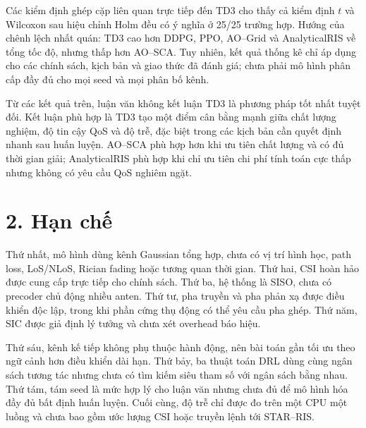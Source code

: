Các kiểm định ghép cặp liên quan trực tiếp đến TD3 cho thấy cả kiểm định $t$ và Wilcoxon sau hiệu chỉnh Holm đều có ý nghĩa ở 25/25 trường hợp. Hướng của chênh lệch nhất quán: TD3 cao hơn DDPG, PPO, AO--Grid và AnalyticalRIS về tổng tốc độ, nhưng thấp hơn AO--SCA. Tuy nhiên, kết quả thống kê chỉ áp dụng cho các chính sách, kịch bản và giao thức đã đánh giá; chưa phải mô hình phân cấp đầy đủ cho mọi seed và mọi phân bố kênh.

Từ các kết quả trên, luận văn không kết luận TD3 là phương pháp tốt nhất tuyệt đối. Kết luận phù hợp là TD3 tạo một điểm cân bằng mạnh giữa chất lượng nghiệm, độ tin cậy QoS và độ trễ, đặc biệt trong các kịch bản cần quyết định nhanh sau huấn luyện. AO--SCA phù hợp hơn khi ưu tiên chất lượng và có đủ thời gian giải; AnalyticalRIS phù hợp khi chỉ ưu tiên chi phí tính toán cực thấp nhưng không có yêu cầu QoS nghiêm ngặt.

\section*{2. Hạn chế}
Thứ nhất, mô hình dùng kênh Gaussian tổng hợp, chưa có vị trí hình học, path loss, LoS/NLoS, Rician fading hoặc tương quan thời gian. Thứ hai, CSI hoàn hảo được cung cấp trực tiếp cho chính sách. Thứ ba, hệ thống là SISO, chưa có precoder chủ động nhiều anten. Thứ tư, pha truyền và pha phản xạ được điều khiển độc lập, trong khi phần cứng thụ động có thể yêu cầu pha ghép. Thứ năm, SIC được giả định lý tưởng và chưa xét overhead báo hiệu.

Thứ sáu, kênh kế tiếp không phụ thuộc hành động, nên bài toán gần tối ưu theo ngữ cảnh hơn điều khiển dài hạn. Thứ bảy, ba thuật toán DRL dùng cùng ngân sách tương tác nhưng chưa có tìm kiếm siêu tham số với ngân sách bằng nhau. Thứ tám, tám seed là mức hợp lý cho luận văn nhưng chưa đủ để mô hình hóa đầy đủ bất định huấn luyện. Cuối cùng, độ trễ chỉ được đo trên một CPU một luồng và chưa bao gồm ước lượng CSI hoặc truyền lệnh tới STAR--RIS.

